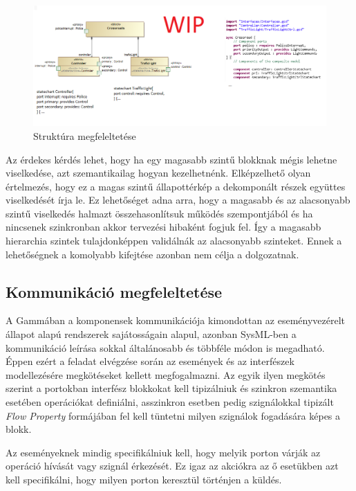 \begin{figure}[!ht]
	\centering
	\includegraphics[width=140mm, keepaspectratio]{figures/contribution/md2g.png}
	\caption{Struktúra megfeleltetése}
	\label{fig:md2g}
\end{figure}

Az érdekes kérdés lehet, hogy ha egy magasabb szintű blokknak mégis lehetne viselkedése, azt szemantikailag hogyan kezelhetnénk. Elképzelhető olyan értelmezés, hogy ez a magas szintű állapottérkép a dekomponált részek együttes viselkedését írja le. Ez lehetőséget adna arra, hogy a magasabb és az alacsonyabb szintű viselkedés halmazt összehasonlítsuk működés szempontjából és ha nincsenek szinkronban akkor tervezési hibaként fogjuk fel. Így a magasabb hierarchia szintek tulajdonképpen validálnák az alacsonyabb szinteket. Ennek a lehetőségnek a komolyabb kifejtése azonban nem célja a dolgozatnak.

\subsection{Kommunikáció megfeleltetése}

A Gammában a komponensek kommunikációja kimondottan az eseményvezérelt állapot alapú rendszerek sajátosságain alapul, azonban SysML-ben a kommunikáció leírása sokkal általánosabb és többféle módon is megadható. Éppen ezért a feladat elvégzése során az események és az interfészek modellezésére megkötéseket kellett megfogalmazni.
Az egyik ilyen megkötés szerint a portokban interfész blokkokat kell tipizálniuk és szinkron szemantika esetében operációkat definiálni, asszinkron esetben pedig szignálokkal tipizált \emph{Flow Property} formájában fel kell tüntetni milyen szignálok fogadására képes a blokk.

Az eseményeknek mindig specifikálniuk kell, hogy melyik porton várják az operáció hívását vagy szignál érkezését. Ez igaz az akciókra az ő esetükben azt kell specifikálni, hogy milyen porton keresztül történjen a küldés.


